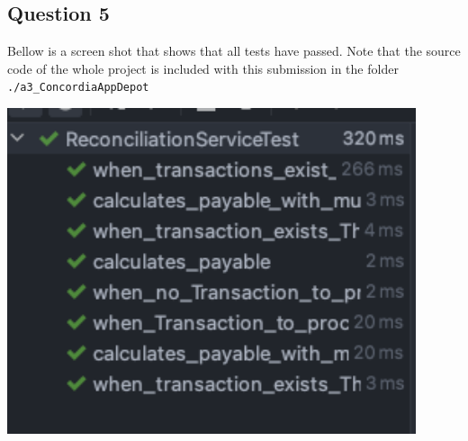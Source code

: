 
\subsection*{Question 5}

\noindent Bellow is a screen shot that shows that all tests have passed. Note that the source code of the whole project is included with this submission in the folder\\ \verb|./a3_ConcordiaAppDepot|

\begin{center}
        \includegraphics[width=0.9\textwidth]{img/partd.png}
\end{center}